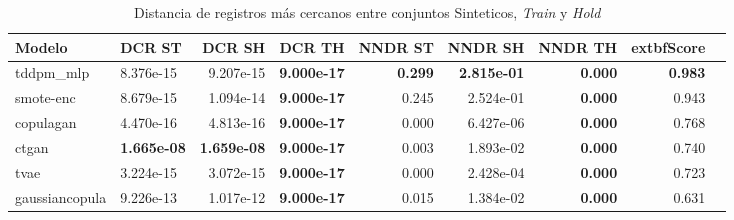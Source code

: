 \begin{table}[H]
\centering
\caption{Distancia de registros más cercanos entre conjuntos Sinteticos, \emph{Train} y \emph{Hold}}
\label{table-dcr-economicos-b-2}
\begin{tabular}{|l|l|r|r|r|r|r|r|r|}
\hline
\rowcolor[gray]{0.8}
Modelo & DCR ST & DCR SH & DCR TH & NNDR ST & NNDR SH & NNDR TH & 	extbf{Score} \\
\hline tddpm\_mlp & 8.376e-15 & 9.207e-15 & \cellcolor[rgb]{0.9, 0.54, 0.52} \bfseries 9.000e-17 & \bfseries 0.299 & \bfseries 2.815e-01 & \cellcolor[rgb]{0.9, 0.54, 0.52} \bfseries 0.000 & \bfseries 0.983 \\
\hline smote-enc & 8.679e-15 & 1.094e-14 & \cellcolor[rgb]{0.9, 0.54, 0.52} \bfseries 9.000e-17 & 0.245 & 2.524e-01 & \cellcolor[rgb]{0.9, 0.54, 0.52} \bfseries 0.000 & 0.943 \\
\hline copulagan & \cellcolor[rgb]{0.9, 0.54, 0.52} 4.470e-16 & \cellcolor[rgb]{0.9, 0.54, 0.52} 4.813e-16 & \cellcolor[rgb]{0.9, 0.54, 0.52} \bfseries 9.000e-17 & \cellcolor[rgb]{0.9, 0.54, 0.52} 0.000 & \cellcolor[rgb]{0.9, 0.54, 0.52} 6.427e-06 & \cellcolor[rgb]{0.9, 0.54, 0.52} \bfseries 0.000 & 0.768 \\
\hline ctgan & \bfseries 1.665e-08 & \bfseries 1.659e-08 & \cellcolor[rgb]{0.9, 0.54, 0.52} \bfseries 9.000e-17 & 0.003 & 1.893e-02 & \cellcolor[rgb]{0.9, 0.54, 0.52} \bfseries 0.000 & 0.740 \\
\hline tvae & 3.224e-15 & 3.072e-15 & \cellcolor[rgb]{0.9, 0.54, 0.52} \bfseries 9.000e-17 & 0.000 & 2.428e-04 & \cellcolor[rgb]{0.9, 0.54, 0.52} \bfseries 0.000 & 0.723 \\
\hline gaussiancopula & 9.226e-13 & 1.017e-12 & \cellcolor[rgb]{0.9, 0.54, 0.52} \bfseries 9.000e-17 & 0.015 & 1.384e-02 & \cellcolor[rgb]{0.9, 0.54, 0.52} \bfseries 0.000 & 0.631 \\
\hline
\end{tabular}
\end{table}
